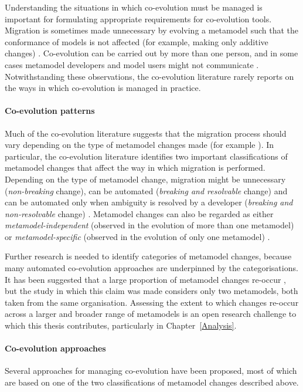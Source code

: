 Understanding the situations in which co-evolution must be managed is important for formulating appropriate requirements for co-evolution tools. Migration \cc is sometimes made unnecessary by evolving a metamodel such that the conformance of models is not affected (for example, making only additive changes) \cite{herrmannsdoerfer09cope}. Co-evolution \cc can be carried out by more than one person, and in some cases metamodel developers and model users might not communicate \cite{cicchetti08automating}. Notwithstanding these observations, the co-evolution literature rarely reports on the ways in which co-evolution is managed in practice. 

\paragraph{Co-evolution patterns}
Much of the co-evolution literature suggests that the migration process should vary depending on the type of metamodel changes made (for example  \cite{gruschko07towards,cicchetti08automating}). In particular, the co-evolution literature identifies two important classifications of metamodel changes that affect the way in which migration is performed. Depending \cc on the type of metamodel change, migration might be unnecessary (\emph{non-breaking} change), can be automated (\emph{breaking and resolvable} change) and can be automated only when ambiguity is resolved by a developer (\emph{breaking and non-resolvable} change) \cite{gruschko07towards}. Metamodel \cc changes can also be regarded as either \emph{metamodel-independent} (observed in the evolution of more than one metamodel) or \emph{metamodel-specific} (observed in the evolution of only one metamodel) \cite{herrmannsdoerfer08automatability}.

Further research is needed to identify categories of metamodel changes, because many automated co-evolution approaches are underpinned by the categorisations. It \cc has been suggested that a large proportion of metamodel changes re-occur \cite{herrmannsdoerfer08automatability}, but the study in which this claim was made considers only two metamodels, both taken from the same organisation. Assessing the extent to which changes re-occur across a larger and broader range of metamodels is an open research challenge to which this thesis contributes, particularly in Chapter~\ref{Analysis}.

\paragraph{Co-evolution approaches}
Several approaches for managing co-evolution have been proposed, most of which are based on one of the two classifications of metamodel changes described above.

